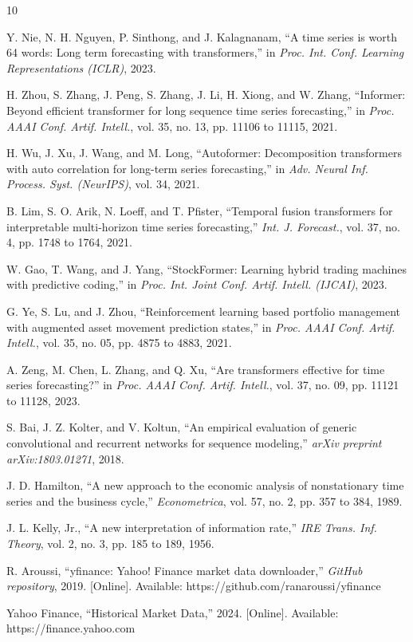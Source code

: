 \documentclass[journal]{IEEEtran}
\begin{document}
\begin{thebibliography}{10}

Y. Nie, N. H. Nguyen, P. Sinthong, and J. Kalagnanam, ``A time series is
worth 64 words: Long term forecasting with transformers,'' in
\textit{Proc. Int. Conf. Learning Representations (ICLR)}, 2023.

H. Zhou, S. Zhang, J. Peng, S. Zhang, J. Li, H. Xiong, and W. Zhang,
``Informer: Beyond efficient transformer for long sequence time series
forecasting,'' in \textit{Proc. AAAI Conf. Artif. Intell.}, vol. 35,
no. 13, pp. 11106 to 11115, 2021.

H. Wu, J. Xu, J. Wang, and M. Long, ``Autoformer: Decomposition
transformers with auto correlation for long-term series forecasting,''
in \textit{Adv. Neural Inf. Process. Syst. (NeurIPS)}, vol. 34, 2021.

B. Lim, S. O. Arik, N. Loeff, and T. Pfister, ``Temporal fusion
transformers for interpretable multi-horizon time series forecasting,''
\textit{Int. J. Forecast.}, vol. 37, no. 4, pp. 1748 to 1764, 2021.

W. Gao, T. Wang, and J. Yang, ``StockFormer: Learning hybrid trading
machines with predictive coding,'' in \textit{Proc. Int. Joint Conf.
Artif. Intell. (IJCAI)}, 2023.

G. Ye, S. Lu, and J. Zhou, ``Reinforcement learning based portfolio
management with augmented asset movement prediction states,'' in
\textit{Proc. AAAI Conf. Artif. Intell.}, vol. 35, no. 05,
pp. 4875 to 4883, 2021.

A. Zeng, M. Chen, L. Zhang, and Q. Xu, ``Are transformers effective for
time series forecasting?'' in \textit{Proc. AAAI Conf. Artif. Intell.},
vol. 37, no. 09, pp. 11121 to 11128, 2023.

S. Bai, J. Z. Kolter, and V. Koltun, ``An empirical evaluation of
generic convolutional and recurrent networks for sequence modeling,''
\textit{arXiv preprint arXiv:1803.01271}, 2018.

J. D. Hamilton, ``A new approach to the economic analysis of
nonstationary time series and the business cycle,'' \textit{Econometrica},
vol. 57, no. 2, pp. 357 to 384, 1989.

J. L. Kelly, Jr., ``A new interpretation of information rate,''
\textit{IRE Trans. Inf. Theory}, vol. 2, no. 3, pp. 185 to 189, 1956.

R. Aroussi, ``yfinance: Yahoo! Finance market data downloader,''
\textit{GitHub repository}, 2019. [Online]. Available:
https://github.com/ranaroussi/yfinance

Yahoo Finance, ``Historical Market Data,'' 2024. [Online]. Available:
https://finance.yahoo.com

\end{thebibliography}
\end{document}
